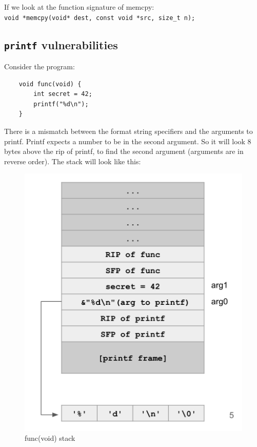 \documentclass{article}
\begin{document}
If we look at the function signature of memcpy: \\
\lstinline{void *memcpy(void* dest, const void *src, size_t n);} \\


\subsection{\lstinline{printf} vulnerabilities}

Consider the program:
\begin{lstlisting}
    void func(void) {
        int secret = 42;
        printf("%d\n");
    }
\end{lstlisting}
There is a mismatch between the format string specifiers and the arguments to printf. Printf expects a number to be in the second argument. So it will look 8 bytes above the rip of printf, to find the second argument (arguments are in reverse order).
The stack will look like this:
\begin{figure}[h]
    \centering
    \includegraphics[scale=0.5]{images/printf-stack-vul.png}
    \caption{func(void) stack}
\end{figure}
\end{document}
